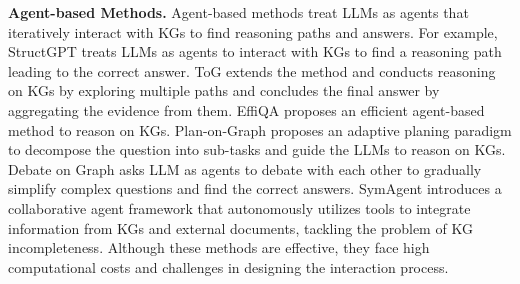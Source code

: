 {\noindent\textbf{Agent-based Methods.} Agent-based methods treat LLMs as agents that iteratively interact with KGs to find reasoning paths and answers. For example, StructGPT \citep{jiang2023structgpt} treats LLMs as agents to interact with KGs to find a reasoning path leading to the correct answer. ToG \citep{sunthink} extends the method and conducts reasoning on KGs by exploring multiple paths and concludes the final answer by aggregating the evidence from them. EffiQA \citep{jiang2024kg} proposes an efficient agent-based method to reason on KGs. Plan-on-Graph \citep{chenplan} proposes an adaptive planing paradigm to decompose the question into sub-tasks and guide the LLMs to reason on KGs. Debate on Graph \citep{ma2024debate} asks LLM as agents to debate with each other to gradually simplify complex questions and find the correct answers. SymAgent \citep{liu2025symagent} introduces a collaborative agent framework that autonomously utilizes tools to integrate information from KGs and external documents, tackling the problem of KG incompleteness. 
Although these methods are effective, they face high computational costs and challenges in designing the interaction process.

}

